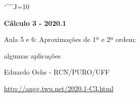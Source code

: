 \documentclass[oneside,12pt]{article}
\begin{document}
\catcode`\^^J=10

\long{}
\long{}
\long{}
\long{}
\long{}
\long{}
\long{}
\long{}
\long{}
\long{}

\long{}
\long{}

\def\frown{\ensuremath{{=}{(}}}
\def\True {\mathbf{V}}
\def\False{\mathbf{F}}

\def\drafturl{http://angg.twu.net/LATEX/2020-1-C2.pdf}
\def\drafturl{http://angg.twu.net/2020.1-C2.html}
\def\draftfooter{\tiny \href{\drafturl}{\jobname{}} \ColorBrown{\shorttoday{} \hours}}


%

\thispagestyle{empty}

\begin{center}

\vspace*{1.2cm}

{\bf \Large Cálculo 3 - 2020.1}

\bsk

Aula 5 e 6: Aproximações de 1ª e 2ª ordem:

algumas aplicações

\bsk

Eduardo Ochs - RCN/PURO/UFF

\url{http://angg.twu.net/2020.1-C3.html}

\end{center}

\newpage

\end{document}
